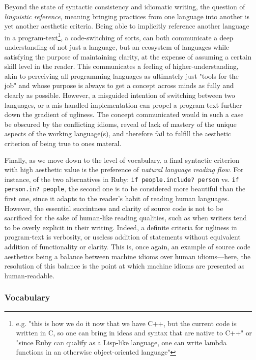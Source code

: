 Beyond the state of syntactic consistency and idiomatic writing, the question of \emph{linguistic reference}, meaning bringing practices from one language into another is yet another aesthetic criteria. Being able to implicitly reference another language in a program-text\footnote{e.g. "this is how we do it now that we have C++, but the current code is written in C, so one can bring in ideas and syntax that are native to C++" or "since Ruby can qualify as a Lisp-like language, one can write lambda functions in an otherwise object-oriented language"}, a code-switching of sorts, can both communicate a deep understanding of not just a language, but an ecosystem of languages while satisfying the purpose of maintaining clarity, at the expense of assuming a certain skill level in the reader. This communicates a feeling of higher-understanding, akin to perceiving all programming languages as ultimately just "tools for the job" and whose purpose is always to get a concept across minds as fully and clearly as possible. However, a misguided intention of switching between two languages, or a mis-handled implementation can propel a program-text further down the gradient of ugliness. The concept communicated would in such a case be obscured by the conflicting idioms, reveal of lack of mastery of the unique aspects of the working language(s), and therefore fail to fulfill the aesthetic criterion of being true to ones materal.

Finally, as we move down to the level of vocabulary, a final syntactic criterion with high aesthetic value is the preference of \emph{natural language reading flow}. For instance, of the two alternatives in Ruby: \lstinline{if people.include? person} vs. \lstinline{if person.in? people}, the second one is to be considered more beautiful than the first one, since it adapts to the reader's habit of reading human languages. However, the essential succintness and clarity of source code is not to be sacrificed for the sake of human-like reading qualities, such as when writers tend to be overly explicit in their writing. Indeed, a definite criteria for ugliness in program-text is verbosity, or useless addition of statements without equivalent addition of functionality or clarity. This is, once again, an example of source code aesthetics being a balance between machine idioms over human idioms—here, the resolution of this balance is the point at which machine idioms are presented as human-readable.

\subsubsection{Vocabulary}
\label{subsubsec:framework-vocabulary}

